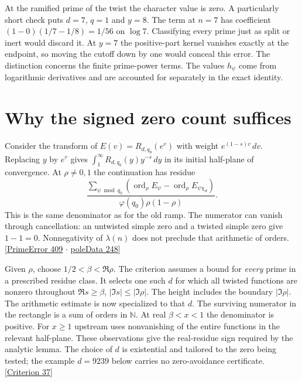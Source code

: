 \documentclass[12pt,letterpaper]{article}
\begin{document}
At the ramified prime of the twist the character value is zero. A particularly short check puts $d=7$, $q=1$ and $y=8$. The term at $n=7$ has coefficient $(1-0)(1/7-1/8)=1/56$ on $\log7$. Classifying every prime just as split or inert would discard it. At $y=7$ the positive-part kernel vanishes exactly at the endpoint, so moving the cutoff down by one would conceal this error. The distinction concerns the finite prime-power terms. The values $h_\psi$ come from logarithmic derivatives and are accounted for separately in the exact identity.


\section{Why the signed zero count suffices}\label{sec:analytic}
Consider the transform of $E(v)=R_{d,q_0}(e^v)$ with weight $e^{(1-s)v}\,dv$. Replacing $y$ by $e^v$ gives $\int_1^\infty R_{d,q_0}(y)y^{-s}\,dy$ in its initial half-plane of convergence. At $\rho\ne0,1$ the continuation has residue
\[
 \frac{\sum_{\psi\bmod q_0}
 (\operatorname{ord}_\rho E_\psi-\operatorname{ord}_\rho E_{\psi\chi_d})}
 {\varphi(q_0)\rho(1-\rho)} .
\]
This is the same denominator as for the old ramp. The numerator can vanish through cancellation: an untwisted simple zero and a twisted simple zero give $1-1=0$. Nonnegativity of $\lambda(n)$ does not preclude that arithmetic of orders. {\small\sffamily\color{mute}[\href{https://github.com/leanprover-community/riemann-hypothesis/blob/e063a923620ee7787b4a1270421478645bf66bdb/src/New/Reduction/Zeros/PrimeError.lean#L409}{PrimeError 409} $\cdot$ \href{https://github.com/nousentllc/riemann-hypothesis/blob/40e56bab026552e089d7afcfeff08d2defb9c005/src/Development/AutomorphicArithmetic/DedekindLFunctions/LandauTheorems/poleData.lean#L248}{poleData 248}]}

Given $\rho$, choose $1/2<\beta<\Re\rho$. The criterion assumes a bound for \emph{every} prime in a prescribed residue class. It selects one such $d$ for which all twisted functions are nonzero throughout $\Re s\ge\beta$, $|\Im s|\le|\Im\rho|$. The height includes the boundary $|\Im\rho|$. The arithmetic estimate is now specialized to that $d$. The surviving numerator in the rectangle is a sum of orders in $\mathbb N$. At real $\beta<x<1$ the denominator is positive. For $x\ge1$ upstream uses nonvanishing of the entire functions in the relevant half-plane. These observations give the real-residue sign required by the analytic lemma. The choice of $d$ is existential and tailored to the zero being tested; the example $d=9239$ below carries no zero-avoidance certificate. {\small\sffamily\color{mute}[\href{https://github.com/leanprover-community/riemann-hypothesis/blob/e063a923620ee7787b4a1270421478645bf66bdb/src/New/Reduction/Zeros/Criterion.lean#L37}{Criterion 37}]}
\end{document}
